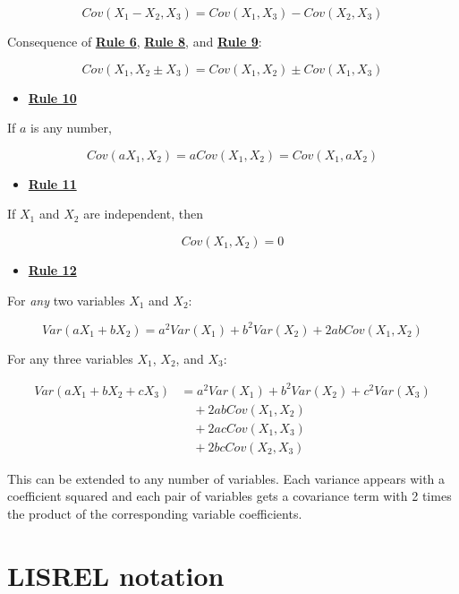 \documentclass[
]{book}
\providecommand{\tightlist}{%
  \setlength{\itemsep}{0pt}\setlength{\parskip}{0pt}}
\begin{document}
\[
Cov\left(X_{1} - X_{2}, X_{3}\right) = Cov\left(X_{1}, X_{3}\right) - Cov\left(X_{2}, X_{3}\right)  
\]

Consequence of \href{./covariance.html\#Rule6}{\textbf{Rule 6}}, \href{./covariance.html\#Rule8}{\textbf{Rule 8}}, and \href{./covariance.html\#Rule9}{\textbf{Rule 9}}:

\[
Cov\left(X_{1}, X_{2} \pm X_{3}\right) = Cov\left(X_{1}, X_{2}\right) \pm Cov\left(X_{1}, X_{3}\right)  
\]

\begin{itemize}
\tightlist
\item
  \href{./covariance.html\#Rule10}{\textbf{Rule 10}}
\end{itemize}

If \(a\) is any number,

\[
Cov\left(a X_{1}, X_{2}\right) = a Cov\left(X_{1}, X_{2}\right) =  Cov\left(X_{1}, a X_{2}\right)  
\]

\begin{itemize}
\tightlist
\item
  \href{./covariance.html\#Rule11}{\textbf{Rule 11}}
\end{itemize}

If \(X_{1}\) and \(X_{2}\) are independent, then

\[
Cov\left(X_{1}, X_{2}\right) = 0
\]

\begin{itemize}
\tightlist
\item
  \href{./covariance.html\#Rule12}{\textbf{Rule 12}}
\end{itemize}

For \emph{any} two variables \(X_{1}\) and \(X_{2}\):

\[
Var(aX_{1} + bX_{2}) = 
    a^2Var(X_{1}) + b^2Var(X_{2}) + 2abCov(X_{1}, X_{2})
\]

For any three variables \(X_{1}\), \(X_{2}\), and \(X_{3}\):

\begin{align}
Var(aX_{1} + bX_{2} + cX_{3}) &= 
    a^2Var(X_{1}) + b^2Var(X_{2}) + c^2Var(X_{3}) \\
    & \quad + 2abCov(X_{1}, X_{2}) \\
    & \quad + 2acCov(X_{1}, X_{3}) \\
    & \quad + 2bcCov(X_{2}, X_{3})
\end{align}

This can be extended to any number of variables. Each variance appears with a coefficient squared and each pair of variables gets a covariance term with 2 times the product of the corresponding variable coefficients.

\hypertarget{appendix-lisrel}{%
\chapter{LISREL notation}\label{appendix-lisrel}}

  
\end{document}
